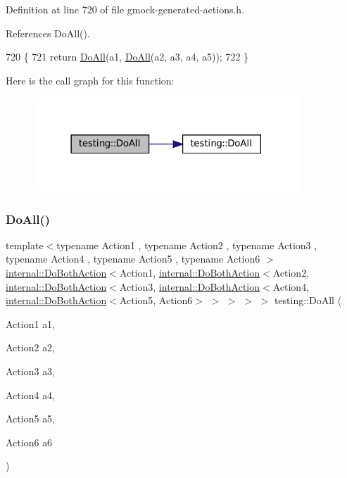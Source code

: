 Definition at line 720 of file gmock-\/generated-\/actions.\+h.



References Do\+All().


\begin{DoxyCode}
720                                                                   \{
721   \textcolor{keywordflow}{return} \hyperlink{namespacetesting_a79ac222c485c7aa0a1774bee17dadb10}{DoAll}(a1, \hyperlink{namespacetesting_a79ac222c485c7aa0a1774bee17dadb10}{DoAll}(a2, a3, a4, a5));
722 \}
\end{DoxyCode}
Here is the call graph for this function\+:
\nopagebreak
\begin{figure}[H]
\begin{center}
\leavevmode
\includegraphics[width=282pt]{namespacetesting_a794c41d43373d7af9cebbc7f1c5e4a57_cgraph}
\end{center}
\end{figure}
\mbox{\label{namespacetesting_aa6c87c8d7520fb333f1559487d3e06e9}} 
\subsubsection{\texorpdfstring{Do\+All()}{DoAll()}\hspace{0.1cm}{\footnotesize\ttfamily [5/9]}}
{\footnotesize\ttfamily template$<$typename Action1 , typename Action2 , typename Action3 , typename Action4 , typename Action5 , typename Action6 $>$ \\
\hyperlink{classtesting_1_1internal_1_1DoBothAction}{internal\+::\+Do\+Both\+Action}$<$Action1, \hyperlink{classtesting_1_1internal_1_1DoBothAction}{internal\+::\+Do\+Both\+Action}$<$Action2, \hyperlink{classtesting_1_1internal_1_1DoBothAction}{internal\+::\+Do\+Both\+Action}$<$Action3, \hyperlink{classtesting_1_1internal_1_1DoBothAction}{internal\+::\+Do\+Both\+Action}$<$Action4, \hyperlink{classtesting_1_1internal_1_1DoBothAction}{internal\+::\+Do\+Both\+Action}$<$Action5, Action6$>$ $>$ $>$ $>$ $>$ testing\+::\+Do\+All (\begin{DoxyParamCaption}\item[{Action1}]{a1,  }\item[{Action2}]{a2,  }\item[{Action3}]{a3,  }\item[{Action4}]{a4,  }\item[{Action5}]{a5,  }\item[{Action6}]{a6 }\end{DoxyParamCaption})\hspace{0.3cm}{\ttfamily [inline]}}



